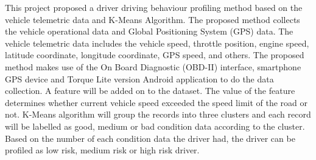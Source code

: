 
This project proposed a driver driving behaviour profiling method based on the vehicle telemetric data and K-Means Algorithm. The proposed method collects the vehicle operational data and Global Positioning System (GPS) data. The vehicle telemetric data includes the vehicle speed, throttle position, engine speed, latitude coordinate, longitude coordinate, GPS speed, and others. The proposed method makes use of the On Board Diagnostic (OBD-II) interface, smartphone GPS device and Torque Lite version Android application to do the data collection. A feature will be added on to the dataset. The value of the feature determines whether current vehicle speed exceeded the speed limit of the road or not. K-Means algorithm will group the records into three clusters and each record will be labelled as good, medium or bad condition data according to the cluster. Based on the number of each condition data the driver had, the driver can be profiled as low risk, medium risk or high risk driver.